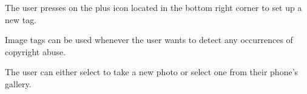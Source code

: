 \begin{minipage}{\textwidth}
  \centering
  \begin{minipage}[t]{4.6cm}
    \vspace{0pt}
    \centering
    \begin{minipage}{4.4cm}
      The user presses on the plus icon located in the bottom right corner to set up a new tag.
    \end{minipage}
  \end{minipage}
  \begin{minipage}[t]{4.6cm}
    \vspace{0pt}
    \centering
    \begin{minipage}{4.4cm}
      Image tags can be used whenever the user wants to detect any occurrences of copyright abuse.
    \end{minipage}
  \end{minipage}
  \begin{minipage}[t]{4.6cm}
    \vspace{0pt}
    \centering
    \begin{minipage}{4.4cm}
      The user can either select to take a new photo or select one from their phone’s gallery.
    \end{minipage}
  \end{minipage}
\end{minipage}

